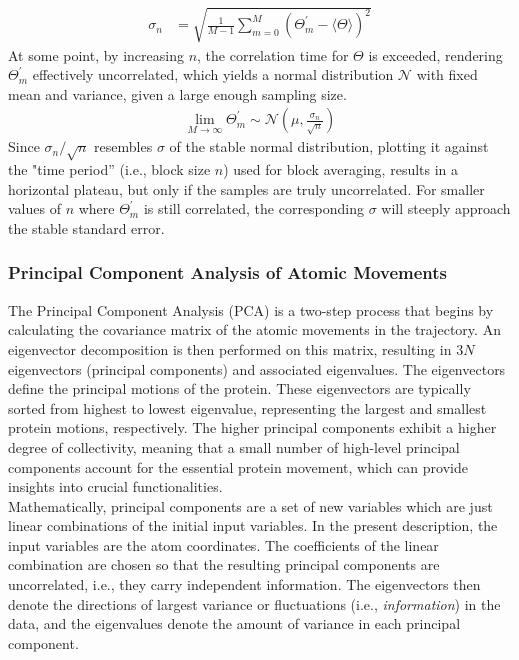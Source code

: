 \documentclass[9pt,tutorial]{livecoms}
\begin{document}
\begin{align}
    \sigma_n & = \sqrt{\frac{1}{M-1} \sum_{m=0}^M  \left( \Theta^\prime_m - \langle \Theta \rangle \right)^2}
\end{align}
At some point, by increasing $n$, the correlation time for $\Theta$ is exceeded, rendering $\Theta^\prime_m$ effectively uncorrelated, which yields a normal distribution $\mathcal{N}$ with fixed mean and variance, given a large enough sampling size.\cite{Flyvbjerg_1989}
\begin{align}
    \lim_{M\rightarrow\infty} \Theta^\prime_m \sim \mathcal{N}\left(\mu,\frac{\sigma_n}{\sqrt{n}}\right)
\end{align}
Since $\sigma_n/\sqrt{n}$ resembles $\sigma$ of the stable normal distribution, plotting it against the "time period'' (i.e., block size $n$) used for block averaging, results in a horizontal plateau, but only if the samples are truly uncorrelated. For smaller values of $n$ where $\Theta^\prime_m$ is still correlated, the corresponding $\sigma$ will steeply approach the stable standard error.\\
\subsubsection*{Principal Component Analysis of Atomic Movements}
The Principal Component Analysis (PCA) is a two-step process that begins by calculating the covariance matrix of the atomic movements in the trajectory. An eigenvector decomposition is then performed on this matrix, resulting in $3N$ eigenvectors (principal components) and associated eigenvalues.
The eigenvectors define the principal motions of the protein. These eigenvectors are typically sorted from highest to lowest eigenvalue, representing the largest and smallest protein motions, respectively. The higher principal components exhibit a higher degree of collectivity, meaning that a small number of high-level principal components account for the essential protein movement, which can provide insights into crucial functionalities.\cite{David_2013}\\
Mathematically, principal components are a set of new variables which are just linear combinations of the initial input variables. In the present description, the input variables are the atom coordinates. The coefficients of the linear combination are chosen so that the resulting principal components are uncorrelated, i.e., they carry independent information. The eigenvectors then denote the directions of largest variance or fluctuations (i.e., \textit{information}) in the data, and the eigenvalues denote the amount of variance in each principal component.  
\end{document}
